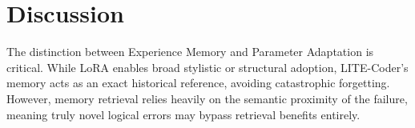 \section{Discussion}
The distinction between Experience Memory and Parameter Adaptation is critical. While LoRA enables broad stylistic or structural adoption, LITE-Coder's memory acts as an exact historical reference, avoiding catastrophic forgetting. However, memory retrieval relies heavily on the semantic proximity of the failure, meaning truly novel logical errors may bypass retrieval benefits entirely.
